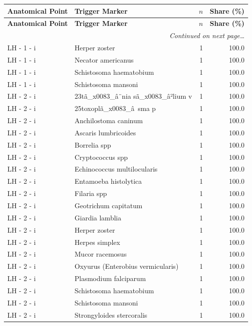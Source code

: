 \documentclass[a4paper,11pt]{article}
\begin{document}
\begin{footnotesize}
\begin{longtable}{p{3.5cm}p{7.5cm}rr}
\toprule
\textbf{Anatomical Point} &
\textbf{Trigger Marker} &
\textbf{$n$} &
\textbf{Share (\%)} \\
\midrule
\endfirsthead
\toprule
\textbf{Anatomical Point} &
\textbf{Trigger Marker} &
\textbf{$n$} &
\textbf{Share (\%)} \\
\midrule
\endhead
\midrule
\multicolumn{4}{r}{\footnotesize\emph{Continued on next page\ldots}} \\
\endfoot
\bottomrule
\endlastfoot
LH - 1 - i & Herper zoster & 1 & 100.0 \\
LH - 1 - i & Necator americanus & 1 & 100.0 \\
LH - 1 - i & Schistosoma haematobium & 1 & 100.0 \\
LH - 1 - i & Schistosoma mansoni & 1 & 100.0 \\
LH - 2 - i & 23tã\_x0083\_â¨nia sã\_x0083\_â²lium v & 1 & 100.0 \\
LH - 2 - i & 25toxoplã\_x0083\_â sma p & 1 & 100.0 \\
LH - 2 - i & Anchilostoma caninum & 1 & 100.0 \\
LH - 2 - i & Ascaris lumbricoides & 1 & 100.0 \\
LH - 2 - i & Borrelia spp & 1 & 100.0 \\
LH - 2 - i & Cryptococcus spp & 1 & 100.0 \\
LH - 2 - i & Echinococcus multilocularis & 1 & 100.0 \\
LH - 2 - i & Entamoeba histolytica & 1 & 100.0 \\
LH - 2 - i & Filaria spp & 1 & 100.0 \\
LH - 2 - i & Geotrichum capitatum & 1 & 100.0 \\
LH - 2 - i & Giardia lamblia & 1 & 100.0 \\
LH - 2 - i & Herper zoster & 1 & 100.0 \\
LH - 2 - i & Herpes simplex & 1 & 100.0 \\
LH - 2 - i & Mucor racemosus & 1 & 100.0 \\
LH - 2 - i & Oxyurus (Enterobius vermicularis) & 1 & 100.0 \\
LH - 2 - i & Plasmodium falciparum & 1 & 100.0 \\
LH - 2 - i & Schistosoma haematobium & 1 & 100.0 \\
LH - 2 - i & Schistosoma mansoni & 1 & 100.0 \\
LH - 2 - i & Strongyloides stercoralis & 1 & 100.0 \\

\end{longtable}
\end{footnotesize}
\end{document}
